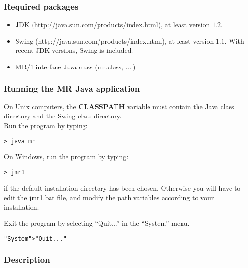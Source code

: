 \subsubsection*{Required packages}
\begin{itemize}
\item JDK (http://java.sun.com/products/index.html), at least version $1.2$.
\item Swing (http://java.sun.com/products/index.html), 
at least version $1.1$. With recent JDK versions, Swing is 
included.
\item MR/1 interface Java class (mr.class, ....)
\end{itemize} 

\subsubsection*{Running the MR Java application}

On Unix computers, the {\bf CLASSPATH} variable must contain the Java class 
directory and the Swing class directory. \\ 
Run the program by typing:
\begin{verbatim}
> java mr
\end{verbatim}

On Windows, run the program by typing:
\begin{verbatim}
> jmr1
\end{verbatim}
if the default installation directory has been chosen. Otherwise you
will have to edit the jmr1.bat file, and modify the path variables according
to your installation.



Exit the program by selecting ``Quit...'' in the ``System'' menu.
\begin{verbatim}
"System">"Quit..."
\end{verbatim}

\subsubsection*{Description}

